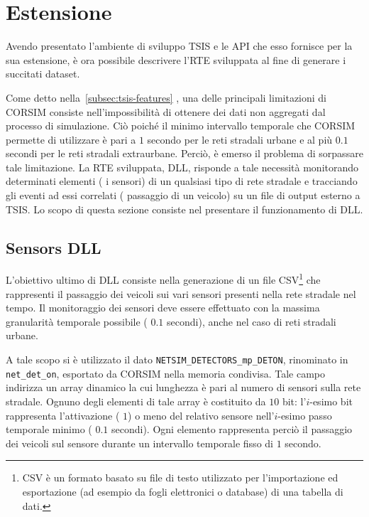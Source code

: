 \cleardoublepage
\section{Estensione}\label{sec:sensors-rte}
Avendo presentato l'ambiente di sviluppo \acs{TSIS} e le \acs{API} che esso fornisce per la sua estensione, è ora possibile descrivere l'\acl{RTE} sviluppata al fine di generare i succitati dataset.

Come detto nella~\autoref{subsec:tsis-features} , una delle principali limitazioni di \acs{CORSIM} consiste nell'impossibilità di ottenere dei dati non aggregati dal processo di simulazione. Ciò poiché il minimo intervallo temporale che \acs{CORSIM} permette di utilizzare è pari a $1$ secondo per le reti stradali urbane e al più $0.1$ secondi per le reti stradali extraurbane. Perciò, è emerso il problema di sorpassare tale limitazione. La \acs{RTE} sviluppata,  \acs{DLL}, risponde a tale necessità monitorando determinati elementi (\ie{} i sensori) di un qualsiasi tipo di rete stradale e tracciando gli eventi ad essi correlati (\ie{} passaggio di un veicolo) su un file di output esterno a \acs{TSIS}. Lo scopo di questa sezione consiste nel presentare il funzionamento di  \acs{DLL}.

\subsection{Sensors DLL}\label{subsec:sensors-dll}
L'obiettivo ultimo di  \acs{DLL} consiste nella generazione di un file \acs{CSV}\footnote{\acf{CSV} è un formato basato su file di testo utilizzato per l'importazione ed esportazione (ad esempio da fogli elettronici o database) di una tabella di dati.} che rappresenti il passaggio dei veicoli sui vari sensori presenti nella rete stradale nel tempo. Il monitoraggio dei sensori deve essere effettuato con la massima granularità temporale possibile (\ie{} $0.1$ secondi), anche nel caso di reti stradali urbane.

A tale scopo si è utilizzato il dato \lstinline[]|NETSIM_DETECTORS_mp_DETON|, rinominato in \lstinline[]|net_det_on|, esportato da \acs{CORSIM} nella memoria condivisa. Tale campo indirizza un array dinamico la cui lunghezza è pari al numero di sensori sulla rete stradale. Ognuno degli elementi di tale array è costituito da $10$ bit: l'$i$-esimo bit rappresenta l'attivazione (\ie{} $1$) o meno del relativo sensore nell'$i$-esimo passo temporale minimo (\ie{} $0.1$ secondi). Ogni elemento rappresenta perciò il passaggio dei veicoli sul sensore durante un intervallo temporale fisso di $1$ secondo.

